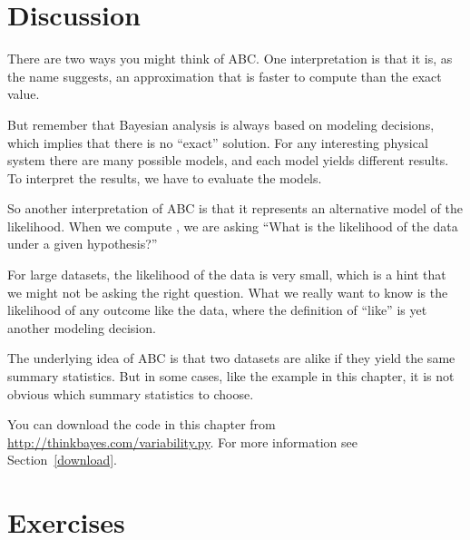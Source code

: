 \documentclass[12pt]{book}
\theoremstyle{exercise}
\begin{document}
\section{Discussion}

There are two ways you might think of ABC.  One interpretation
is that it is, as the name suggests, an approximation that is
faster to compute than the exact value.

But remember that Bayesian analysis is always
based on modeling decisions, which implies that there is no
``exact'' solution.  For any interesting
physical system there are many possible models, and each model
yields different results.  To interpret the results, we have to
evaluate the models.

So another interpretation of ABC is that it represents an alternative
model of the likelihood.  When we compute , we are asking
``What is the likelihood of the data under a given hypothesis?''

For large datasets, the likelihood of the data is very small, which
is a hint that we might not be asking the right question.  What
we really want to know is the likelihood of any outcome
like the data, where the definition of ``like'' is yet another
modeling decision.

The underlying idea of ABC is that two datasets are alike if they yield
the same summary statistics.  But in some cases, like the example in
this chapter, it is not obvious which summary statistics to choose.

You can download the code in this chapter from
\url{http://thinkbayes.com/variability.py}.
  For more information
see Section~\ref{download}.

\section{Exercises}
\end{document}
